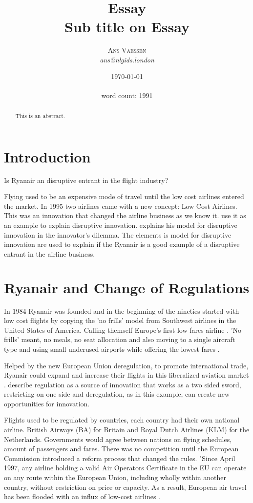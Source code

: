 \documentclass[a4paper, 11pt]{article}
\title{\textbf{Essay}\\Sub title on Essay}
\author{\textsc{Ans Vaessen}
\\{\textit{ans@nlgids.london}}}
\date{\today\\ \ \\
word count: 1991}
\begin{document}
\maketitle

\begin{abstract}
This is an abstract.
\end{abstract}

\vspace{30pt} %

\section*{Introduction}
Is Ryanair an disruptive entrant in the flight industry?


Flying used to be an expensive mode of travel until the low cost airlines entered the market. In 1995 two airlines came with a new concept: Low Cost Airlines. This was an innovation that changed the airline business as we know it. \cite{TiddBessant} use it as an example to explain disruptive innovation. \citep{Christensen97} explains his model for disruptive innovation in the innovator's dilemma. The elements is model for disruptive innovation are used to explain if the Ryanair is a good example of a disruptive entrant in the airline business.

\section{Ryanair and Change of Regulations}

In 1984 Ryanair was founded and in the beginning of the nineties started with low cost flights by copying the 'no frills' model from Southwest airlines in the United States of America. Calling themself Europe’s first low fares airline \cite{Ryanair}. 'No frills' meant, no meals, no seat allocation and also moving to a single aircraft type and using small underused airports while offering the lowest fares \citep{Diaconu}.

Helped by the new European Union deregulation, to promote international trade, Ryanair could expand and increase their flights in this liberalized aviation market \citep{Diaconu}. \cite{TiddBessant} describe regulation as a source of innovation that works as a two sided sword, restricting on one side and deregulation, as in this example, can create new opportunities for innovation.

Flights used to be regulated by countries, each country had their own national airline. British Airways (BA) for Britain and
Royal Dutch Airlines (KLM) for the Netherlands. Governments would agree between nations on flying schedules, amount of
passengers and fares. There was no competition until the European Commission introduced a reform process that changed the
rules. "Since April 1997, any airline holding a valid Air Operators Certificate in the EU can operate on any route within the
European Union, including wholly within another country, without restriction on price or capacity. As a result, European air
travel has been flooded with an influx of low-cost airlines \citep{Eurocontrol2017}.
\end{document}

